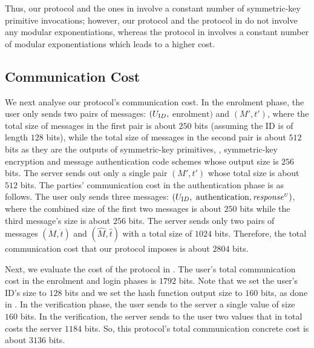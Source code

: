Thus,  our protocol and the ones in \cite{WangW18,JareckiJKSS21,MatsuoMY11} involve a constant number of symmetric-key primitive invocations; however, our protocol and the protocol in \cite{MatsuoMY11} do not involve any modular exponentiations, whereas the protocol in  \cite{WangW18,JareckiJKSS21} involves a constant number of modular exponentiations which leads to a higher cost. 


\subsection{Communication Cost}


We next analyse our protocol's communication cost. In the enrolment phase,  the user only sends two pairs of messages: $(U_{\text ID}, $ $\text{enrolment})$ and $(M', t')$, where the total size of messages in the first pair is about $250$ bits (assuming the ID is of length $128$ bits),  while the total size of messages in the second pair is about  $512$ bits as they are the outputs of symmetric-key primitives, \ie, symmetric-key encryption and message authentication code schemes whose output size is $256$ bits. The server sends out only a single pair $(M', t')$ whose total size is about $512$ bits. 
% 
The parties' communication cost in the authentication phase is as follows. The user only sends three messages: $(U_{\text ID}, $ $\text{authentication}, \mathit{response}^{\scriptscriptstyle U})$, where the combined size of the first two messages is about $250$ bits while the third message's size is about $256$ bits. The server sends only two pairs of messages $(\ddot M, \ddot t)$ and $(\hat M, \hat t)$ with a total size of $1024$ bits. Therefore, the total communication cost that our protocol imposes is about $2804$ bits. 

Next, we evaluate the cost of the protocol in \cite{WangW18}. The user's total communication cost in the enrolment and login phases is $1792$ bits. Note that we set the user's ID's size to $128$ bits and we set the hash function output size to $160$ bits, as done in \cite{WangW18}. In the verification phase, the user sends to the server a single value of size $160$ bits. In the verification, the server sends to the user two values that in total costs the server $1184$ bits. So, this protocol's total communication concrete cost is about $3136$ bits.%


